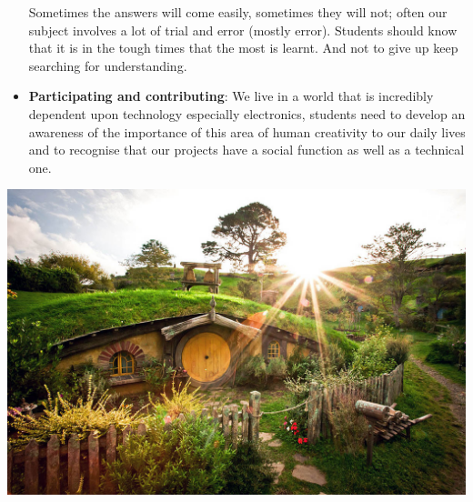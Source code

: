 \begin{itemize}
Sometimes the answers will come easily, sometimes they will not; often our
subject involves a lot of trial and error (mostly error). Students should know
that it is in the tough times that the most is learnt. And not to give up keep
searching for understanding.
\\
  \item 
\textbf{Participating and contributing}: We live in a world that is incredibly
dependent upon technology especially electronics, students need to develop an
awareness of the importance of this area of human creativity to our daily lives
and to recognise that our projects have a social function as well as a technical
one.
\\
\end{itemize}

\includegraphics[width=0.8\textheight]{bcollis/12Hobbiton.jpeg}

\secup
